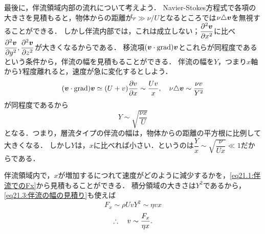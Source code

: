 最後に，伴流領域内部の流れについて考えよう．
Navier-Stokes方程式で各項の大きさを見積もると，物体からの距離が$r \gg \nu/U$となるところでは$\nu\triangle\vb*{v}$を無視することができる．
しかし伴流内部では，これは成立しない；$\dpdv[2]{\v}{x}$に比べ$\dpdv[2]{\v}{y},\dpdv[2]{\v}{z}$が大きくなるからである．
移流項$(\vb*{v} \cdot \operatorname{grad})\vb*{v}$とこれらが同程度であるという条件から，伴流の幅を見積もることができる．
伴流の幅を$Y$，つまり$x$軸から$Y$程度離れると，速度が急に変化するとしよう．
\[
    (\vb*{v} \cdot \operatorname{grad})\vb*{v} \simeq (U+v)\pdv{v}{x} \sim \frac{Uv}{x}, \quad
    \nu\triangle\vb*{v} \sim \frac{\nu v}{Y^2}
\]
が同程度であるから
\begin{equation}\label{eq21.3:伴流の幅の見積り}
    Y \sim \sqrt{\frac{\nu x}{U}}
\end{equation}
となる．つまり，層流タイプの伴流の幅は，物体からの距離の平方根に比例して大きくなる．
しかし$Y$は，$x$に比べれば小さい．というのは$\dfrac{Y}{x} \sim \sqrt{\dfrac{\nu}{Ux}} \ll 1$だからである．

伴流領域内で，$x$が増加するにつれて速度がどのように減少するかを，\eqref{eq21.1:伴流でのFx}から見積もることができる．
積分領域の大きさは$Y^2$であるから，\eqref{eq21.3:伴流の幅の見積り}も使えば
\[
    F_x \sim \rho U v Y^2 \sim \eta vx
\]
\begin{equation}
    \therefore\quad v \sim \frac{F_x}{\eta x}.
\end{equation}


\BackToTheToc